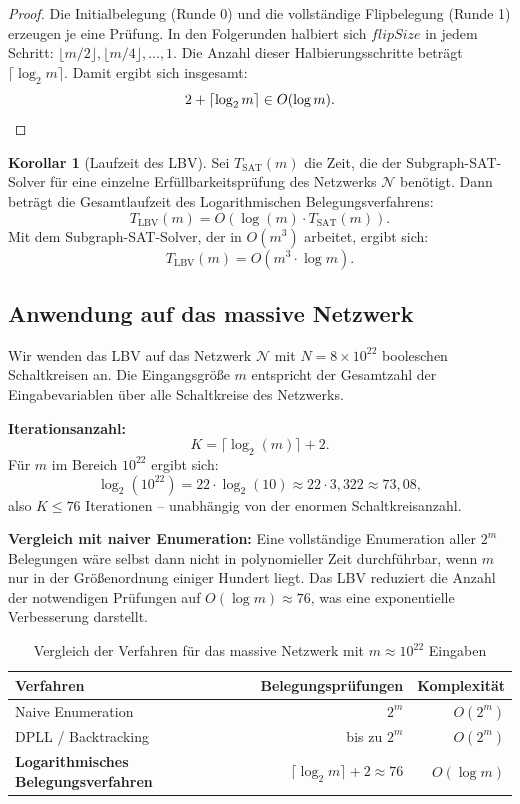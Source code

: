 ﻿\documentclass[a4paper,12pt]{article}
\theoremstyle{definition}
\newtheorem{korollar}{Korollar}
\begin{document}
\begin{proof}
	Die Initialbelegung (Runde 0) und die vollständige Flipbelegung (Runde 1) erzeugen
	je eine Prüfung. In den Folgerunden halbiert sich $\mathit{flipSize}$ in jedem Schritt:
	$\lfloor m/2 \rfloor, \lfloor m/4 \rfloor, \ldots, 1$. Die Anzahl dieser Halbierungsschritte
	beträgt $\lceil \log_2 m \rceil$. Damit ergibt sich insgesamt:
	\[
	2 + \lceil \log_2 m \rceil \in O(\log m). \qedhere
	\]
\end{proof}

\begin{korollar}[Laufzeit des LBV]
	Sei $T_{\mathrm{SAT}}(m)$ die Zeit, die der Subgraph-SAT-Solver für eine einzelne
	Erfüllbarkeitsprüfung des Netzwerks $\mathcal{N}$ benötigt. Dann beträgt die
	Gesamtlaufzeit des Logarithmischen Belegungsverfahrens:
	\[
	T_{\mathrm{LBV}}(m) = O\!\left(\log(m) \cdot T_{\mathrm{SAT}}(m)\right).
	\]
	Mit dem Subgraph-SAT-Solver, der in $O(m^3)$ arbeitet, ergibt sich:
	\[
	T_{\mathrm{LBV}}(m) = O\!\left(m^3 \cdot \log m\right).
	\]
\end{korollar}

\subsection{Anwendung auf das massive Netzwerk}

Wir wenden das LBV auf das Netzwerk $\mathcal{N}$ mit $N = 8 \times 10^{22}$ booleschen
Schaltkreisen an. Die Eingangsgröße $m$ entspricht der Gesamtzahl der Eingabevariablen
über alle Schaltkreise des Netzwerks.

\medskip
\noindent\textbf{Iterationsanzahl:}
\[
K = \lceil \log_2(m) \rceil + 2.
\]
Für $m$ im Bereich $10^{22}$ ergibt sich:
\[
\log_2(10^{22}) = 22 \cdot \log_2(10) \approx 22 \cdot 3{,}322 \approx 73{,}08,
\]
also $K \leq 76$ Iterationen -- unabhängig von der enormen Schaltkreisanzahl.

\medskip
\noindent\textbf{Vergleich mit naiver Enumeration:}
Eine vollständige Enumeration aller $2^m$ Belegungen wäre selbst dann nicht in polynomieller
Zeit durchführbar, wenn $m$ nur in der Größenordnung einiger Hundert liegt. Das LBV reduziert
die Anzahl der notwendigen Prüfungen auf $O(\log m) \approx 76$, was eine exponentielle
Verbesserung darstellt.

\begin{table}[h]
	\centering
	\begin{tabular}{lrr}
		\toprule
		\textbf{Verfahren} & \textbf{Belegungsprüfungen} & \textbf{Komplexität} \\
		\midrule
		Naive Enumeration & $2^m$ & $O(2^m)$ \\
		DPLL / Backtracking & bis zu $2^m$ & $O(2^m)$ \\
		\textbf{Logarithmisches Belegungsverfahren} & $\lceil \log_2 m \rceil + 2 \approx 76$ & $O(\log m)$ \\
		\bottomrule
	\end{tabular}
	\caption{Vergleich der Verfahren für das massive Netzwerk mit $m \approx 10^{22}$ Eingaben}
	\label{tab:lbv-vergleich}
\end{table}
\end{document}
